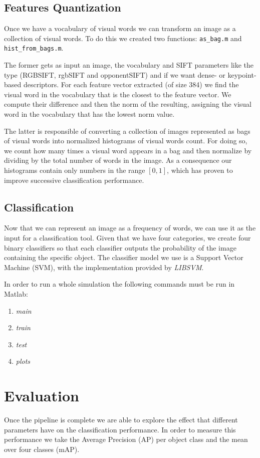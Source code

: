 \documentclass[11pt]{article}
\begin{document}
\subsection{Features Quantization}
Once we have a vocabulary of visual words we can transform an image as a
collection of visual words. To do this we created two functions:
\texttt{as\_bag.m} and \texttt{hist\_from\_bags.m}.

The former gets as input an image, the vocabulary and SIFT parameters like the
type (RGBSIFT, rgbSIFT and opponentSIFT) and if we want dense- or keypoint-based
descriptors. For each feature vector extracted (of size 384) we find the visual
word in the vocabulary that is the closest to the feature vector. We compute
their difference and then the norm of the resulting, assigning the visual word
in the vocabulary that has the lowest norm value.

The latter is responsible of converting a collection of images represented as
bags of visual words into normalized histograms of visual words count. For doing so, we count how many times a visual word appears in a bag and then normalize by dividing by the total number of words in the image. As a consequence our histograms contain only numbers in the range $[0, 1]$, which has proven to improve successive classification performance.


\subsection{Classification}
Now that we can represent an image as a frequency of words, we can use it as the input for a classification tool. Given that we have four categories, we create four binary classifiers so that each classifier outputs the probability of the image containing the specific object. The classifier model we use is a  Support Vector Machine (SVM), with the implementation provided by \textit{LIBSVM}.

In order to run a whole simulation the following commands must be run in Matlab:

\begin{enumerate}
	\item \textit{main}
	\item \textit{train}
	\item \textit{test}
	\item \textit{plots}
\end{enumerate}


\section{Evaluation}
Once the pipeline is complete we are able to explore the effect that different parameters have on the classification performance. In order to measure this performance we take the Average Precision (AP) per object class and the mean over four classes (mAP). 
\end{document}
